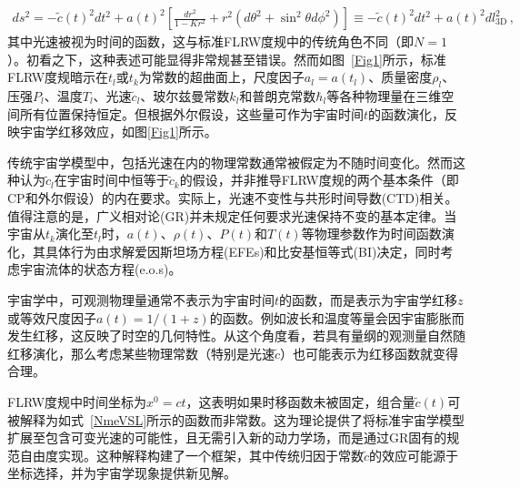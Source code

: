 \documentclass[jkps,preprint,fleqn]{revtex4}
\newcommand{\tc}{\tilde{c}}
\begin{document}
\begin{CJK*}{UTF8}{gbsn}
\begin{align}
ds^2 = - \tc(t)^2 dt^2 + a(t)^2 \left[ \frac{dr^2}{1-Kr^2} + r^2  \left( d \theta^2 + \sin^2 \theta d \phi^2 \right)  \right] \equiv - \tc(t)^2 dt^2 + a(t)^2 dl_{3\textrm{D}}^2 \label{dstgen} \,,
\end{align}
其中光速被视为时间的函数，这与标准FLRW度规中的传统角色不同（即$N = 1$）。初看之下，这种表述可能显得非常规甚至错误。然而如图~\ref{Fig1}所示，标准FLRW度规暗示在$t_l$或$t_k$为常数的超曲面上，尺度因子$a_l = a(t_l)$、质量密度$\rho_l$、压强$P_l$、温度$T_l$、光速$\tc_l$、玻尔兹曼常数$k_l$和普朗克常数$\hbar_l$等各种物理量在三维空间所有位置保持恒定。但根据外尔假设，这些量可作为宇宙时间$t$的函数演化，反映宇宙学红移效应，如图\ref{Fig1}所示。

传统宇宙学模型中，包括光速在内的物理常数通常被假定为不随时间变化。然而这种认为$\tc_l$在宇宙时间中恒等于$\tc_k$的假设，并非推导FLRW度规的两个基本条件（即CP和外尔假设）的内在要求。实际上，光速不变性与共形时间导数(CTD)相关。值得注意的是，广义相对论(GR)并未规定任何要求光速保持不变的基本定律。当宇宙从$t_k$演化至$t_l$时，$a(t)$、$\rho(t)$、$P(t)$和$T(t)$等物理参数作为时间函数演化，其具体行为由求解爱因斯坦场方程(EFEs)和比安基恒等式(BI)决定，同时考虑宇宙流体的状态方程(e.o.s)。

宇宙学中，可观测物理量通常不表示为宇宙时间$t$的函数，而是表示为宇宙学红移$z$或等效尺度因子$a(t) = 1/(1+z)$的函数。例如波长和温度等量会因宇宙膨胀而发生红移，这反映了时空的几何特性。从这个角度看，若具有量纲的观测量自然随红移演化，那么考虑某些物理常数（特别是光速$\tc$）也可能表示为红移函数就变得合理。

FLRW度规中时间坐标为$x^0 = ct$，这表明如果时移函数未被固定，组合量$\tc(t)$可被解释为如式~\eqref{NmeVSL}所示的函数而非常数。这为理论提供了将标准宇宙学模型扩展至包含可变光速的可能性，且无需引入新的动力学场，而是通过GR固有的规范自由度实现\cite{Lee:2024zcu}。这种解释构建了一个框架，其中传统归因于常数$\tc$的效应可能源于坐标选择，并为宇宙学现象提供新见解。


\end{CJK*}
\end{document}
